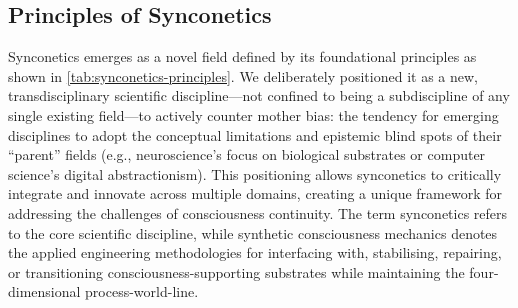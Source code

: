 \documentclass[10pt]{article}
\begin{document}
\begin{sloppypar}
  \subsection{Principles of Synconetics}
  \label{sec:principles}

  Synconetics emerges as a novel field defined by its foundational principles as shown in \autoref{tab:synconetics-principles}. We deliberately positioned it as a new, transdisciplinary scientific discipline—not confined to being a subdiscipline of any single existing field—to actively counter mother bias: the tendency for emerging disciplines to adopt the conceptual limitations and epistemic blind spots of their “parent” fields (e.g., neuroscience’s focus on biological substrates or computer science’s digital abstractionism). This positioning allows synconetics to critically integrate and innovate across multiple domains, creating a unique framework for addressing the challenges of consciousness continuity. The term synconetics refers to the core scientific discipline, while synthetic consciousness mechanics denotes the applied engineering methodologies for interfacing with, stabilising, repairing, or transitioning consciousness-supporting substrates while maintaining the four-dimensional process-world-line.


\end{sloppypar}
\end{document}
